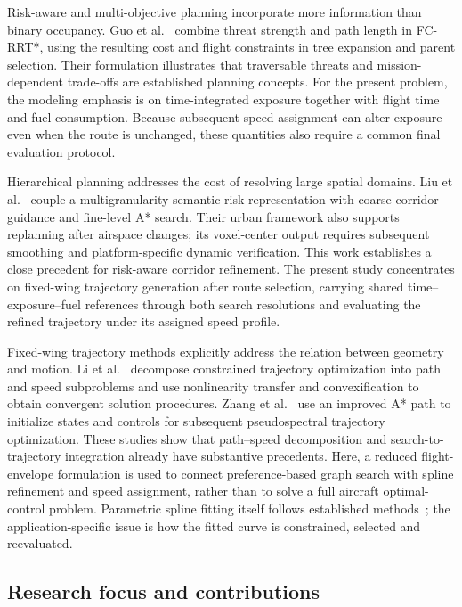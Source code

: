 Risk-aware and multi-objective planning incorporate more information than
binary occupancy. Guo et al.~\cite{guo2022} combine threat strength and path
length in FC-RRT*, using the resulting cost and flight constraints in tree
expansion and parent selection. Their formulation illustrates that
traversable threats and mission-dependent trade-offs are established
planning concepts. For the present problem, the modeling emphasis is on
time-integrated exposure together with flight time and fuel consumption.
Because subsequent speed assignment can alter exposure even when the route
is unchanged, these quantities also require a common final evaluation
protocol.

Hierarchical planning addresses the cost of resolving large spatial
domains. Liu et al.~\cite{liu2026} couple a multigranularity semantic-risk
representation with coarse corridor guidance and fine-level A* search.
Their urban framework also supports replanning after airspace changes; its
voxel-center output requires subsequent smoothing and platform-specific
dynamic verification. This work establishes a close precedent for
risk-aware corridor refinement. The present study concentrates on
fixed-wing trajectory generation after route selection, carrying shared
time--exposure--fuel references through both search resolutions and
evaluating the refined trajectory under its assigned speed profile.

Fixed-wing trajectory methods explicitly address the relation between
geometry and motion. Li et al.~\cite{li2025} decompose constrained trajectory
optimization into path and speed subproblems and use nonlinearity transfer
and convexification to obtain convergent solution procedures. Zhang et
al.~\cite{zhang2026} use an improved A* path to initialize states and controls
for subsequent pseudospectral trajectory optimization. These studies show
that path--speed decomposition and search-to-trajectory integration already
have substantive precedents. Here, a reduced flight-envelope formulation
is used to connect preference-based graph search with spline refinement
and speed assignment, rather than to solve a full aircraft optimal-control
problem. Parametric spline fitting itself follows established
methods~\cite{dierckx1993}; the application-specific issue is how the fitted
curve is constrained, selected and reevaluated.

\subsection{Research focus and contributions}
\label{sec:contributions}

